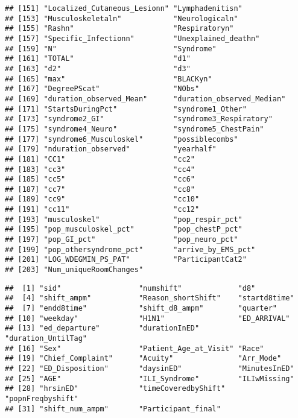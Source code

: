 \documentclass[]{elsarticle} %
\begin{document}
\begin{verbatim}
## [151] "Localized_Cutaneous_Lesionn" "Lymphadenitisn"             
## [153] "Musculoskeletaln"            "Neurologicaln"              
## [155] "Rashn"                       "Respiratoryn"               
## [157] "Specific_Infectionn"         "Unexplained_deathn"         
## [159] "N"                           "Syndrome"                   
## [161] "TOTAL"                       "d1"                         
## [163] "d2"                          "d3"                         
## [165] "max"                         "BLACKyn"                    
## [167] "DegreePScat"                 "NObs"                       
## [169] "duration_observed_Mean"      "duration_observed_Median"   
## [171] "StartsDuringPct"             "syndrome1_Other"            
## [173] "syndrome2_GI"                "syndrome3_Respiratory"      
## [175] "syndrome4_Neuro"             "syndrome5_ChestPain"        
## [177] "syndrome6_Musculoskel"       "possiblecombs"              
## [179] "nduration_observed"          "yearhalf"                   
## [181] "CC1"                         "cc2"                        
## [183] "cc3"                         "cc4"                        
## [185] "cc5"                         "cc6"                        
## [187] "cc7"                         "cc8"                        
## [189] "cc9"                         "cc10"                       
## [191] "cc11"                        "cc12"                       
## [193] "musculoskel"                 "pop_respir_pct"             
## [195] "pop_musculoskel_pct"         "pop_chestP_pct"             
## [197] "pop_GI_pct"                  "pop_neuro_pct"              
## [199] "pop_othersyndrome_pct"       "arrive_by_EMS_pct"          
## [201] "LOG_WDEGMIN_PS_PAT"          "ParticipantCat2"            
## [203] "Num_uniqueRoomChanges"
\end{verbatim}

\begin{verbatim}
##  [1] "sid"                  "numshift"             "d8"                  
##  [4] "shift_ampm"           "Reason_shortShift"    "startd8time"         
##  [7] "endd8time"            "shift_d8_ampm"        "quarter"             
## [10] "weekday"              "H1N1"                 "ED_ARRIVAL"          
## [13] "ed_departure"         "durationInED"         "duration_UntilTag"   
## [16] "Sex"                  "Patient_Age_at_Visit" "Race"                
## [19] "Chief_Complaint"      "Acuity"               "Arr_Mode"            
## [22] "ED_Disposition"       "daysinED"             "MinutesInED"         
## [25] "AGE"                  "ILI_Syndrome"         "ILIwMissing"         
## [28] "hrsinED"              "timeCoveredbyShift"   "popnFreqbyshift"     
## [31] "shift_num_ampm"       "Participant_final"
\end{verbatim}
\end{document}
